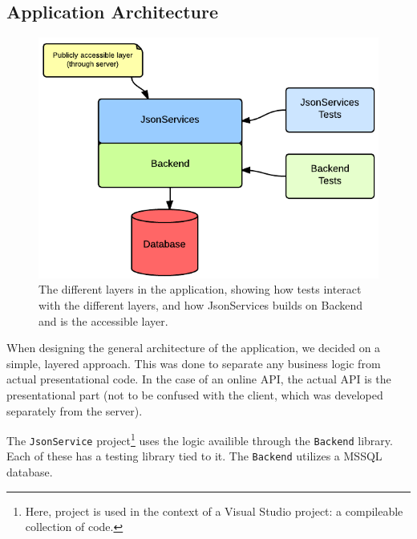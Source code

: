 \subsection{Application Architecture}

\begin{figure}[hbt]
	\centering
	\includegraphics[scale=0.5]{./p1design/layers.png}
	\caption{The different layers in the application, showing how tests interact with
        the different layers, and how JsonServices builds on Backend and is the accessible
        layer.}
	\label{fig:layers}
\end{figure}

When designing the general architecture of the application, we decided on a simple, layered approach.
This was done to separate any business logic from actual presentational code. In the case of an online
API, the actual API is the presentational part (not to be confused with the client, which was developed
separately from the server).

The \verb+JsonService+ project\footnote{Here, project is used in the context of a Visual Studio project:
a compileable collection of code.} uses the logic availible through the \verb+Backend+ library. Each of these has
a testing library tied to it. The \verb+Backend+ utilizes a MSSQL database.